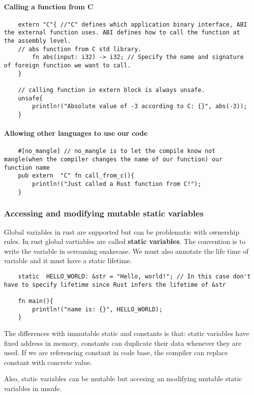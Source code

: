 \paragraph*{Calling a function from C}

\begin{lstlisting}
    extern "C"{ //"C" defines which application binary interface, ABI the external function uses. ABI defines how to call the function at the assembly level.
    // abs function from C std library.
        fn abs(input: i32) -> i32; // Specify the name and signature of foreign function we want to call.
    }
    
    // calling function in extern block is always unsafe.
    unsafe{
        println!("Absolute value of -3 according to C: {}", abs(-3));
    }
\end{lstlisting}

\paragraph*{Allowing other languages to use our code}
\begin{lstlisting}
    #[no_mangle] // no_mangle is to let the compile know not mangle(when the compiler changes the name of our function) our function name
    pub extern  "C" fn call_from_c(){
        println!("Just called a Rust function from C!");
    }
\end{lstlisting}


\subsubsection{Accessing and modifying mutable static variables}

\begin{definition}
    Global variables in rust are supported but can be problematic with ownership rules. In rust global vartiables are called \textbf{static variables}. The convention is to write the variable in screaming snakecase. We must also annotate the life time of variable and it must have a static lifetime.

\begin{lstlisting}
    static  HELLO_WORLD: &str = "Hello, world!"; // In this case don't have to specify lifetime since Rust infers the lifetime of &str
    
    fn main(){
        println!("name is: {}", HELLO_WORLD);
    }
\end{lstlisting}
The differences with immutable static and constants is that: static variables have fixed address in memory, constants can duplicate their data whenever they are used. If we are referencing constant in code base, the compiler can replace constant with concrete value.

Also, static variables can be mutable but accesing an modifying mutable static variables in unsafe.
\end{definition}

